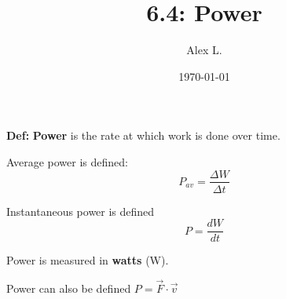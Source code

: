\documentclass{article}
\title{6.4: Power}
\author{Alex L.}
\date{\today}
\begin{document}
\maketitle

\textbf{Def:} \textbf{Power} is the rate at which work is done over time.

Average power is defined:$$P_{av} = \frac{\Delta W}{\Delta t}$$

Instantaneous power is defined $$P = \frac{dW}{dt}$$

Power is measured in \textbf{watts} (W).

Power can also be defined $P = \vec{F} \cdot \vec{v}$
\end{document}
